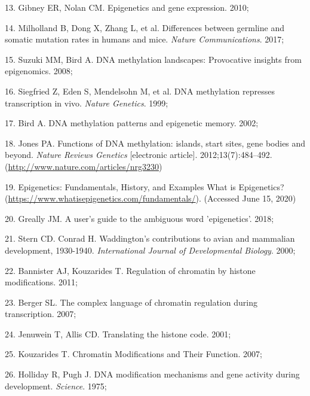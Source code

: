 \documentclass[11pt,oneside]{bristolthesis}
\newenvironment{cslreferences}%
  {}%
  {\par}
\begin{document}
\begin{cslreferences}
\leavevmode\hypertarget{ref-Gibney2010}{}%
13. Gibney ER, Nolan CM. Epigenetics and gene expression. 2010;

\leavevmode\hypertarget{ref-Milholland2017}{}%
14. Milholland B, Dong X, Zhang L, et al. Differences between germline and somatic mutation rates in humans and mice. \emph{Nature Communications}. 2017;

\leavevmode\hypertarget{ref-Suzuki2008}{}%
15. Suzuki MM, Bird A. DNA methylation landscapes: Provocative insights from epigenomics. 2008;

\leavevmode\hypertarget{ref-Siegfried1999}{}%
16. Siegfried Z, Eden S, Mendelsohn M, et al. DNA methylation represses transcription in vivo. \emph{Nature Genetics}. 1999;

\leavevmode\hypertarget{ref-Bird2002}{}%
17. Bird A. DNA methylation patterns and epigenetic memory. 2002;

\leavevmode\hypertarget{ref-Jones2012}{}%
18. Jones PA. Functions of DNA methylation: islands, start sites, gene bodies and beyond. \emph{Nature Reviews Genetics} {[}electronic article{]}. 2012;13(7):484--492. (\url{http://www.nature.com/articles/nrg3230})

\leavevmode\hypertarget{ref-epigenetic-marks-figure}{}%
19. Epigenetics: Fundamentals, History, and Examples \textbar{} What is Epigenetics? (\url{https://www.whatisepigenetics.com/fundamentals/}). (Accessed June 15, 2020)

\leavevmode\hypertarget{ref-Greally2018}{}%
20. Greally JM. A user's guide to the ambiguous word 'epigenetics'. 2018;

\leavevmode\hypertarget{ref-Stern2000}{}%
21. Stern CD. Conrad H. Waddington's contributions to avian and mammalian development, 1930-1940. \emph{International Journal of Developmental Biology}. 2000;

\leavevmode\hypertarget{ref-Bannister2011}{}%
22. Bannister AJ, Kouzarides T. Regulation of chromatin by histone modifications. 2011;

\leavevmode\hypertarget{ref-Berger2007}{}%
23. Berger SL. The complex language of chromatin regulation during transcription. 2007;

\leavevmode\hypertarget{ref-Jenuwein2001}{}%
24. Jenuwein T, Allis CD. Translating the histone code. 2001;

\leavevmode\hypertarget{ref-Kouzarides2007}{}%
25. Kouzarides T. Chromatin Modifications and Their Function. 2007;

\leavevmode\hypertarget{ref-Holliday1975}{}%
26. Holliday R, Pugh J. DNA modification mechanisms and gene activity during development. \emph{Science}. 1975;


\end{cslreferences}
\end{document}
